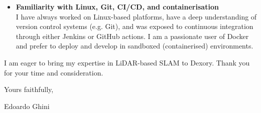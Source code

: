 \begin{itemize}
    \textbf{ Solid experience with ROS 2, C++, and Python} \\
    I have worked with C++ for 7+ years and used Python alongside it as a
    supporting scripting language.
    I have developed ROS nodes during my experience working at Inria and, in
    Kudan, I use ROS2 as a wrapper around the SLAM library.
  \item
    \textbf{Familiarity with Linux, Git, CI/CD, and containerisation} \\
    I have always worked on Linux-based platforms, have a deep understanding of
    version control systems (e.g. Git), and was exposed to continuous integration
    through either Jenkins or GitHub actions. I am a passionate user of Docker and
    prefer to deploy and develop in sandboxed (containerised) environments.
\end{itemize}

I am eager to bring my expertise in LiDAR-based SLAM to Dexory.
Thank you for your time and consideration.

\smallskip

Yours faithfully,

\medskip

Edoardo Ghini

